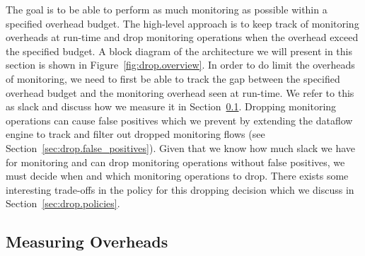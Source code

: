 The goal is to be able to perform as much monitoring as possible within a specified overhead budget.
The high-level approach is to keep track of monitoring overheads at run-time
and drop monitoring operations when the overhead exceed the specified budget.
A block diagram of the architecture we will present in this section is shown in
Figure~\ref{fig:drop.overview}.  In order to do limit the overheads of
monitoring, we need to first be able to track the gap between the specified
overhead budget and the monitoring overhead seen at run-time. We refer to this
as slack and discuss how we measure it in Section~\ref{sec:drop.slack}. 
Dropping monitoring operations can cause false positives which we prevent by
extending the dataflow engine to track and filter out dropped monitoring flows (see
Section~\ref{sec:drop.false_positives}).
Given that we know how much slack we have for monitoring and can drop
monitoring operations without false positives, we must decide when and which
monitoring operations to drop.  There exists some interesting trade-offs in the
policy for this dropping decision which we discuss in
Section~\ref{sec:drop.policies}.

\subsection{Measuring Overheads}
\label{sec:drop.slack}

